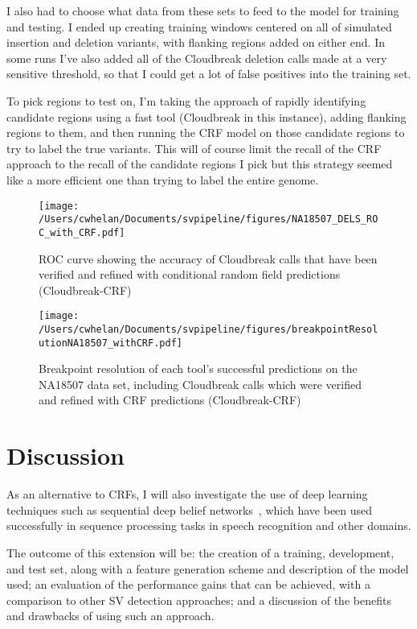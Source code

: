 I also had to choose what data from these sets to feed to the model for training and testing. I ended up creating training windows centered on all of simulated insertion and deletion variants, with flanking regions added on either end. In some runs I've also added all of the Cloudbreak deletion calls made at a very sensitive threshold, so that I could get a lot of false positives into the training set. 

To pick regions to test on, I'm taking the approach of rapidly identifying candidate regions using a fast tool (Cloudbreak in this instance), adding flanking regions to them, and then running the CRF model on those candidate regions to try to label the true variants. This will of course limit the recall of the CRF approach to the recall of the candidate regions I pick but this strategy seemed like a more efficient one than trying to label the entire genome.

\begin{figure}
\centering
\texttt{[image: /Users/cwhelan/Documents/svpipeline/figures/NA18507\_DELS\_ROC\_with\_CRF.pdf]}
\caption{ROC curve showing the accuracy of Cloudbreak calls that have been verified and refined with conditional random field predictions (Cloudbreak-CRF)}
\label{roc_NA18507_with_crf}
\end{figure}

\begin{figure}
\centering
\texttt{[image: /Users/cwhelan/Documents/svpipeline/figures/breakpointResolutionNA18507\_withCRF.pdf]}
\caption{Breakpoint resolution of each tool's successful predictions on the NA18507 data set, including Cloudbreak calls which were verified and refined with CRF predictions (Cloudbreak-CRF)}
\label{breakpoint_resolution_NA18507_with_crf}
\end{figure}

\section{Discussion}

As an alternative to CRFs, I will also investigate the use of deep learning techniques such as sequential deep belief networks~\cite{andrew2012:sdbn}, which have been used successfully in sequence processing tasks in speech recognition and other domains.

The outcome of this extension will be: the creation of a training, development, and test set, along with a feature generation scheme and description of the model used; an evaluation of the performance gains that can be achieved, with a comparison to other SV detection approaches; and a discussion of the benefits and drawbacks of using such an approach.

